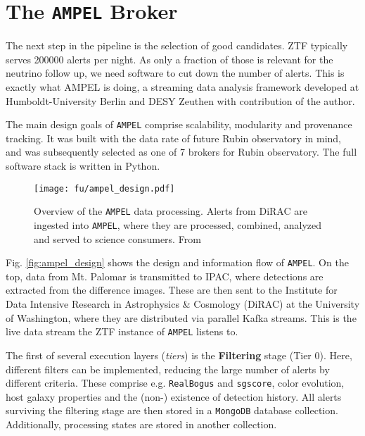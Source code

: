 \section{The \texttt{AMPEL} Broker} \label{ampel}
The next step in the pipeline is the selection of good candidates. ZTF typically serves 200000 alerts per night. As only a fraction of those is relevant for the neutrino follow up, we need software to cut down the number of alerts. This is exactly what AMPEL is doing, a streaming data analysis framework developed at Humboldt-University Berlin and DESY Zeuthen with contribution of the author.

The main design goals of \texttt{AMPEL} comprise scalability, modularity and provenance tracking. It was built with the data rate of future Rubin observatory  in mind, and was subsequently selected as one of 7 brokers for Rubin observatory. The full software stack is written in Python.


\begin{figure}[h!]
    \texttt{[image: fu/ampel\_design.pdf]}
    \caption[\texttt{AMPEL} overview]{Overview of the \texttt{AMPEL} data processing. Alerts from DiRAC are ingested into \texttt{AMPEL}, where they are processed, combined, analyzed and served to science consumers. From \cite{Nordin2019}}
\end{figure}

Fig. \ref{fig:ampel_design} shows the design and information flow of \texttt{AMPEL}. On the top, data from Mt. Palomar is transmitted to IPAC, where detections are extracted from the difference images. These are then sent to the Institute for Data Intensive Research in Astrophysics \& Cosmology (DiRAC) at the University of Washington, where they are distributed via parallel Kafka streams. This is the live data stream the ZTF instance of \texttt{AMPEL} listens to.

The first of several execution layers (\textit{tiers}) is the \textbf{Filtering} stage (Tier 0). Here, different filters can be implemented, reducing the large number of alerts by different criteria. These comprise e.g. \texttt{RealBogus} and \texttt{sgscore}, color evolution, host galaxy properties and the (non-) existence of detection history. All alerts surviving the filtering stage are then stored in a \texttt{MongoDB} database collection. Additionally, processing states are stored in another collection.

